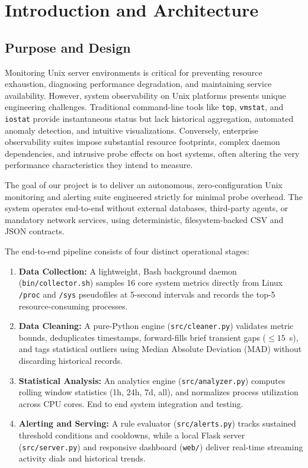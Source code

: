 \section{Introduction and Architecture}

\subsection{Purpose and Design}
Monitoring Unix server environments is critical for preventing resource exhaustion, diagnosing performance degradation, and maintaining service availability. However, system observability on Unix platforms presents unique engineering challenges. Traditional command-line tools like \texttt{top}, \texttt{vmstat}, and \texttt{iostat} provide instantaneous status but lack historical aggregation, automated anomaly detection, and intuitive visualizations. Conversely, enterprise observability suites  impose substantial resource footprints, complex daemon dependencies, and intrusive probe effects on host systems, often altering the very performance characteristics they intend to measure.

The goal of our project is to deliver an autonomous, zero-configuration Unix monitoring and alerting suite engineered strictly for minimal probe overhead. The system operates end-to-end without external databases, third-party agents, or mandatory network services, using deterministic, filesystem-backed CSV and JSON contracts.

The end-to-end pipeline consists of four distinct operational stages:
\begin{enumerate}
    \item \textbf{Data Collection:} A lightweight,  Bash background daemon (\texttt{bin/collector.sh}) samples 16 core system metrics directly from Linux \texttt{/proc} and \texttt{/sys} pseudofiles at 5-second intervals and records the top-5 resource-consuming processes.
    \item \textbf{Data Cleaning:} A pure-Python engine (\texttt{src/cleaner.py}) validates metric bounds, deduplicates timestamps, forward-fills brief transient gaps ($\le 15$~s), and tags statistical outliers using Median Absolute Deviation (MAD) without discarding historical records.
    \item \textbf{Statistical Analysis:} An analytics engine (\texttt{src/analyzer.py}) computes rolling window statistics (1h, 24h, 7d, all), and normalizes process utilization across CPU cores. End to end system integration and testing.
    \item \textbf{Alerting and Serving:} A rule evaluator (\texttt{src/alerts.py}) tracks sustained threshold conditions and cooldowns, while a local Flask server (\texttt{src/server.py}) and responsive dashboard (\texttt{web/}) deliver real-time streaming activity dials and historical trends.
\end{enumerate}

